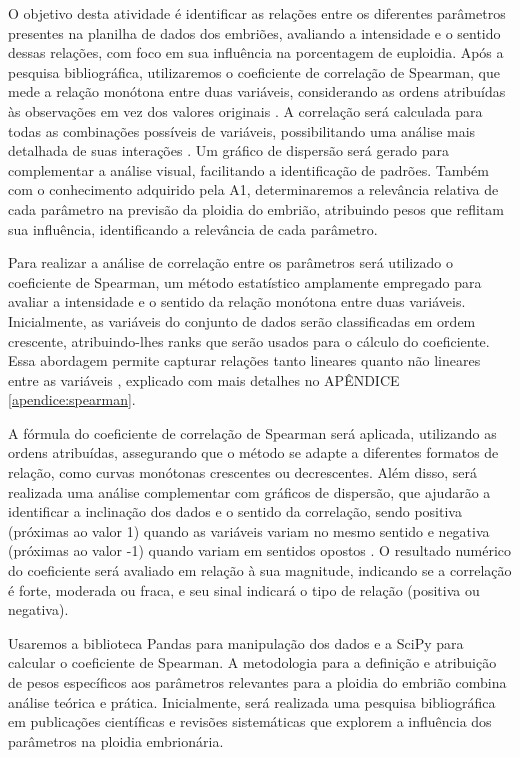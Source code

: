 O objetivo desta atividade é identificar as relações entre os diferentes parâmetros presentes na planilha de dados dos embriões, avaliando a intensidade e o sentido dessas relações, com foco em sua influência na porcentagem de euploidia. Após a pesquisa bibliográfica, utilizaremos o coeficiente de correlação de Spearman, que mede a relação monótona entre duas variáveis, considerando as ordens atribuídas às observações em vez dos valores originais \cite{sousa2019}. A correlação será calculada para todas as combinações possíveis de variáveis, possibilitando uma análise mais detalhada de suas interações \cite{sousa2019}. Um gráfico de dispersão será gerado para complementar a análise visual, facilitando a identificação de padrões. Também com o conhecimento adquirido pela A1, determinaremos a relevância relativa de cada parâmetro na previsão da ploidia do embrião, atribuindo pesos que reflitam sua influência, identificando a relevância de cada parâmetro.

Para realizar a análise de correlação entre os parâmetros será utilizado o coeficiente de Spearman, um método estatístico amplamente empregado para avaliar a intensidade e o sentido da relação monótona entre duas variáveis. Inicialmente, as variáveis do conjunto de dados serão classificadas em ordem crescente, atribuindo-lhes ranks que serão usados para o cálculo do coeficiente. Essa abordagem permite capturar relações tanto lineares quanto não lineares entre as variáveis \cite{sousa2019}, explicado com mais detalhes no APÊNDICE \ref{apendice:spearman}. 

A fórmula do coeficiente de correlação de Spearman será aplicada, utilizando as ordens atribuídas, assegurando que o método se adapte a diferentes formatos de relação, como curvas monótonas crescentes ou decrescentes. Além disso, será realizada uma análise complementar com gráficos de dispersão, que ajudarão a identificar a inclinação dos dados e o sentido da correlação, sendo positiva (próximas ao valor 1) quando as variáveis variam no mesmo sentido e negativa (próximas ao valor -1) quando variam em sentidos opostos \cite{sousa2019}. O resultado numérico do coeficiente será avaliado em relação à sua magnitude, indicando se a correlação é forte, moderada ou fraca, e seu sinal indicará o tipo de relação (positiva ou negativa). 

Usaremos a biblioteca Pandas para manipulação dos dados e a SciPy para calcular o coeficiente de Spearman. A metodologia para a definição e atribuição de pesos específicos aos parâmetros relevantes para a ploidia do embrião combina análise teórica e prática. Inicialmente, será realizada uma pesquisa bibliográfica em publicações científicas e revisões sistemáticas que explorem a influência dos parâmetros na ploidia embrionária.

